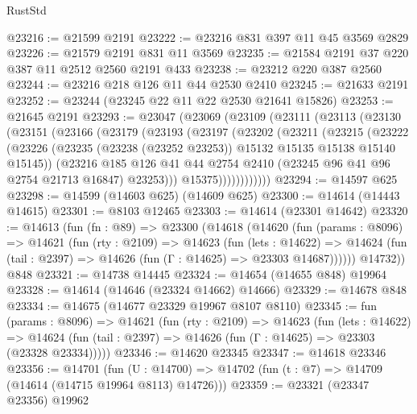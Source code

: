\begin{lexlean}{RustStd}
\begin{coremodule}
@23216 := @21599 @2191
@23222 := @23216 @831 @397 @11 @45 @3569 @2829
@23226 := @21579 @2191 @831 @11 @3569
@23235 := @21584 @2191 @37 @220 @387 @11 @2512 @2560 @2191 @433
@23238 := @23212 @220 @387 @2560
@23244 := @23216 @218 @126 @11 @44 @2530 @2410
@23245 := @21633 @2191
@23252 := @23244 (@23245 @22 @11 @22 @2530 @21641 @15826)
@23253 := @21645 @2191
@23293 := @23047
    (@23069
      (@23109
        (@23111
          (@23113
            (@23130
              (@23151
                (@23166
                  (@23179
                    (@23193
                      (@23197
                        (@23202
                          (@23211
                            (@23215
                              (@23222
                                (@23226
                                  (@23235
                                    (@23238 (@23252 @23253))
                                    @15132
                                    @15135
                                    @15138
                                    @15140
                                    @15145))
                                (@23216
                                  @185
                                  @126
                                  @41
                                  @44
                                  @2754
                                  @2410
                                  (@23245 @96 @41 @96 @2754 @21713 @16847)
                                  @23253)))
                            @15375))))))))))))
@23294 := @14597 @625
@23298 := @14599 (@14603 @625) (@14609 @625)
@23300 := @14614 (@14443 @14615)
@23301 := @8103 @12465
@23303 := @14614 (@23301 @14642)
@23320 := @14613
    (fun (fn : @89) =>
    @23300
      (@14618
        (@14620
          (fun (params : @8096) =>
          @14621
            (fun (rty : @2109) =>
            @14623
              (fun (lets : @14622) =>
              @14624 (fun (tail : @2397) => @14626 (fun (Γ : @14625) => @23303 @14687))))))
        @14732))
    @848
@23321 := @14738 @14445
@23324 := @14654 (@14655 @848) @19964
@23328 := @14614 (@14646 (@23324 @14662) @14666)
@23329 := @14678 @848
@23334 := @14675 (@14677 @23329 @19967 @8107 @8110)
@23345 := fun (params : @8096) =>
  @14621
    (fun (rty : @2109) =>
    @14623
      (fun (lets : @14622) =>
      @14624 (fun (tail : @2397) => @14626 (fun (Γ : @14625) => @23303 (@23328 @23334)))))
@23346 := @14620 @23345
@23347 := @14618 @23346
@23356 := @14701
    (fun (U : @14700) => @14702 (fun (t : @7) => @14709 (@14614 (@14715 @19964 @8113) @14726)))
@23359 := @23321 (@23347 @23356) @19962

\end{coremodule}
\end{lexlean}
